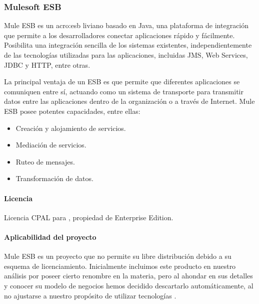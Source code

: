 \subsubsection{Mulesoft ESB}
\label{soa:tecnologias:mulesoft-esb}

Mule ESB es un \gls{acro:esb} liviano basado en Java, una plataforma de integración que permite a los desarrolladores conectar aplicaciones rápido y fácilmente.  Posibilita una integración sencilla de los sistemas existentes, independientemente de las tecnologías utilizadas para las aplicaciones, incluidas JMS, Web Services, JDBC y HTTP, entre otras.

La principal ventaja de un ESB es que permite que diferentes aplicaciones se comuniquen entre sí, actuando como un sistema de transporte para transmitir datos entre las aplicaciones dentro de la organización o a través de Internet. Mule ESB posee potentes capacidades, entre ellas:

\begin{itemize}
  \item Creación y alojamiento de servicios.
  \item Mediación de servicios.
  \item Ruteo de mensajes.
  \item Transformación de datos.
\end{itemize}

\paragraph{Licencia}

Licencia CPAL para , propiedad de Enterprise Edition.

\paragraph{Aplicabilidad del proyecto}

Mule ESB es un proyecto que no permite su libre distribución debido a su esquema de licenciamiento. Inicialmente incluimos este producto en nuestro análisis por poseer cierto renombre en la materia, pero al ahondar en sus detalles y conocer su modelo de negocios hemos decidido descartarlo automáticamente, al no ajustarse a nuestro propósito de utilizar tecnologías .
